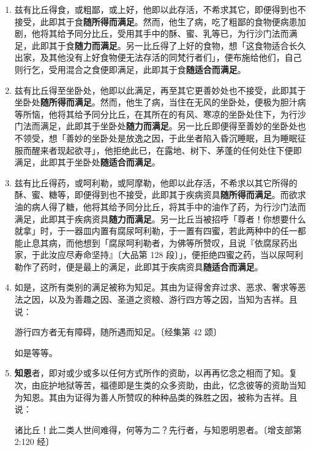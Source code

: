 \begin{enumerate}
\item 兹有比丘得食，或粗鄙，或上好，他即以此存活，不希求其它，即便得到也不接受，此即其于食\textbf{随所得而满足}。然而，他生了病，吃了粗鄙的食物便病患加剧，他将其给予同分比丘，受用其手中的酥、蜜、乳等已，为行沙门法而满足，此即其于食\textbf{随力而满足}。另一比丘得了上好的食物，想「这食物适合长久出家，及其他没有上好食物便无法存活的同梵行者们」，便布施给他们，自己则行乞，受用混合之食便即满足，此即其于食\textbf{随适合而满足}。
\item 兹有比丘得至坐卧处，他即以此满足，再至其它更善妙处也不接受，此即其于坐卧处\textbf{随所得而满足}。然而，他生了病，当住在无风的坐卧处，便极为胆汁病等所恼，他将其给予同分比丘，在其所在的有风、寒凉的坐卧处住下，为行沙门法而满足，此即其于坐卧处\textbf{随力而满足}。另一比丘即便得至善妙的坐卧处也不领受，想「善妙的坐卧处是放逸之因，于此坐者陷入昏沉睡眠，且为睡眠征服而醒来者现起欲寻」，他拒绝此已，在露地、树下、茅蓬的任何处住下便即满足，此即其于坐卧处\textbf{随适合而满足}。
\item 兹有比丘得药，或呵利勒，或阿摩勒，他即以此存活，不希求以其它所得的酥、蜜、糖等，即便得到也不接受，此即其于疾病资具\textbf{随所得而满足}。而欲求油的病人得了糖，他将其给予同分比丘，将其手中的油作了药，为行沙门法而满足，此即其于疾病资具\textbf{随力而满足}。另一比丘当被招呼「尊者！你想要什么就拿」时，于一器皿内置有腐尿呵利勒，于一置有四蜜，若此两种中的任一都能止息其病，而他想到「腐尿呵利勒者，为佛等所赞叹，且说『依腐尿药出家，于此汝应尽寿命坚持』{\bluefootnotesize 〔大品第 128 段〕}」，便拒绝四蜜之药，当以尿呵利勒作了药时，便是最上的满足，此即其于疾病资具\textbf{随适合而满足}。
\item 如是，这所有类别的满足被称为知足。其由为证得舍弃过求、恶求、奢求等恶法之因，以及为善趣之因、圣道之资粮、游行四方等之因，当知为吉祥。且说：\begin{quoting}游行四方者无有障碍，随所遇而知足。{\bluefootnotesize 〔经集第 42 颂〕}\end{quoting}如是等等。
\item \textbf{知恩}者，即对或少或多以任何方式所作的资助，以再再忆念之相而了知。复次，由庇护地狱等苦，福德即是生类的众多资助，由此，忆念彼等的资助当知为知恩。其由为证得为善人所赞叹的种种品类的殊胜之因，被称为吉祥。且说：\begin{quoting}诸比丘！此二类人世间难得，何等为二？先行者，与知恩明恩者。{\bluefootnotesize 〔增支部第 2:120 经〕}\end{quoting}

\end{enumerate}
